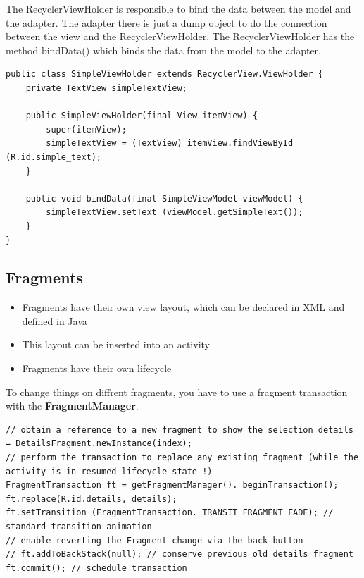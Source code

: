 \begin{breakbox}

The RecyclerViewHolder is responsible to bind the data between the model
and the adapter. The adapter there is just a dump object to do the
connection between the view and the RecyclerViewHolder. The
RecyclerViewHolder has the method bindData() which binds the data from
the model to the adapter.

\begin{lstlisting}
public class SimpleViewHolder extends RecyclerView.ViewHolder {
    private TextView simpleTextView;

    public SimpleViewHolder(final View itemView) {
        super(itemView);
        simpleTextView = (TextView) itemView.findViewById (R.id.simple_text);
    }

    public void bindData(final SimpleViewModel viewModel) {
        simpleTextView.setText (viewModel.getSimpleText());
    }
}
\end{lstlisting}
\end{breakbox}


\subsection{Fragments}

\begin{breakbox}
\begin{itemize}
    \item Fragments have their own view
layout, which can be declared in XML and defined in Java
\item This layout
can be inserted into an activity
\item Fragments have their own lifecycle

\end{itemize}

\end{breakbox}

\begin{breakbox}

To change things on diffrent fragments, you have to use a fragment
transaction with the \textbf{FragmentManager}.

\begin{lstlisting}
// obtain a reference to a new fragment to show the selection details = DetailsFragment.newInstance(index);
// perform the transaction to replace any existing fragment (while the activity is in resumed lifecycle state !)
FragmentTransaction ft = getFragmentManager(). beginTransaction();
ft.replace(R.id.details, details);
ft.setTransition (FragmentTransaction. TRANSIT_FRAGMENT_FADE); // standard transition animation
// enable reverting the Fragment change via the back button
// ft.addToBackStack(null); // conserve previous old details fragment
ft.commit(); // schedule transaction
\end{lstlisting}
\end{breakbox}

